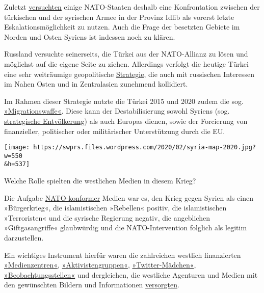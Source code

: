 Zuletzt
\href{https://uk.reuters.com/article/uk-syria-security-turkey-usa/us-condemns-idlib-assaults-stands-by-turkey-secretary-of-state-pompeo-idUKKBN1ZY2FH}{versuchten}
einige NATO-Staaten deshalb eine Konfrontation zwischen der türkischen
und der syrischen Armee in der Provinz Idlib als vorerst letzte
Eskalationsmöglichkeit zu nutzen. Auch die Frage der besetzten Gebiete
im Norden und Osten Syriens ist indessen noch zu klären.

Russland versuchte seinerseits, die Türkei aus der NATO-Allianz zu lösen
und möglichst auf die eigene Seite zu ziehen. Allerdings verfolgt die
heutige Türkei eine sehr weiträumige geopolitische
\href{https://foreignpolicy.com/2016/10/23/turkeys-religious-nationalists-want-ottoman-borders-iraq-erdogan/}{Strategie},
die auch mit russischen Interessen im Nahen Osten und in Zentralasien
zunehmend kollidiert.

Im Rahmen dieser Strategie nutzte die Türkei 2015 und 2020 zudem die
sog.
\href{https://en.wikipedia.org/wiki/Refugees_as_weapons}{»Migrationswaffe«}.
Diese kann der Destabilisierung sowohl Syriens (sog.
\href{https://www.rt.com/news/319797-syria-depopulation-refugees-assange/}{strategische
Entvölkerung}) als auch Europas dienen, sowie der Forcierung von
finanzieller, politischer oder militärischer Unterstützung durch die EU.

\texttt{[image: https://swprs.files.wordpress.com/2020/02/syria-map-2020.jpg?w=550\\\&h=537]}

Welche Rolle spielten die westlichen Medien in diesem Krieg?

Die Aufgabe \href{https://swprs.org/medien-navigator/}{NATO-konformer}
Medien war es, den Krieg gegen Syrien als einen »Bürgerkrieg«, die
islamistischen »Rebellen« positiv, die islamistischen »Terroristen« und
die syrische Regierung negativ, die angeblichen »Giftgasangriffe«
glaubwürdig und die NATO-Intervention folglich als legitim darzustellen.

Ein wichtiges Instrument hierfür waren die zahlreichen westlich
finanzierten
\href{https://www.middleeasteye.net/news/revealed-british-government-covert-propaganda-campaign-syria}{»Medienzentren«},
\href{https://www.unz.com/pgiraldi/the-fraud-of-the-white-helmets/}{»Aktivistengruppen«},
\href{https://www.middleeasteye.net/news/twitter-executive-also-part-time-officer-uk-army-psychological-warfare-unit}{»Twitter-Mädchen«},
\href{https://thegrayzone.com/2018/06/06/syrian-observatory-for-human-rights-funding-sohr-uk-government/}{»Beobachtungsstellen«}
und dergleichen, die westliche Agenturen und Medien mit den gewünschten
Bildern und Informationen
\href{http://blauerbote.com/2016/11/12/faelschungen-der-rebellen-in-syrien/}{versorgten}.

